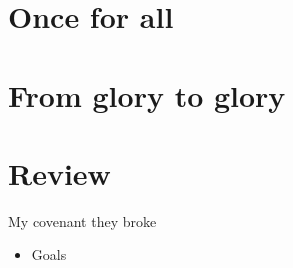 \section{Once for all}

\section{From glory to glory}

\section{Review}

\begin{frame}{My covenant they broke}
	\begin{itemize}
		\item Goals
	\end{itemize}
	
\end{frame}


